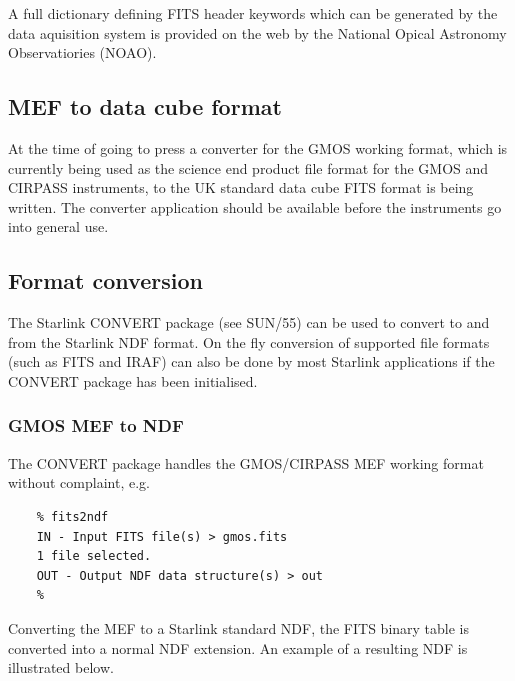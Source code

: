 \documentclass[twoside,11pt]{article}
\newcommand{\htmladdnormallink}[2]{#1}
\newcommand{\xref}[3]{#1}
\newcommand{\xlabel}[1]{}
\begin{document}
A full \htmladdnormallink{dictionary}{http://iraf.noao.edu/projects/ccdmosaic/imagedef/fitsdic.html} defining FITS header keywords which can be generated by the data aquisition system is provided on the web by the National Opical Astronomy Observatiories (NOAO).
 
\subsection{\xlabel{sc16_mef2cub}MEF to data cube format\label{sc16_mef2cub}}

At the time of going to press a converter for the GMOS working format, which is currently being used as the science end product file format for the GMOS and CIRPASS instruments, to the UK standard data cube FITS format is being written. The converter application should be available before the instruments go into general use. 

\subsection{\xlabel{sc16_converting}Format conversion\label{sc16_converting}}

The Starlink CONVERT package (see \xref{SUN/55}{sun55}{}) can be used to convert to and from the Starlink NDF format. On the fly conversion of supported file formats (such as FITS and IRAF) can also be done by most Starlink applications if the CONVERT package has been initialised.

\subsubsection{GMOS MEF to NDF}

The \xref{CONVERT}{sun55}{} package handles the GMOS/CIRPASS MEF working format without complaint, e.g.\

\begin{verbatim}
    % fits2ndf
    IN - Input FITS file(s) > gmos.fits
    1 file selected.
    OUT - Output NDF data structure(s) > out
    %
\end{verbatim}

Converting the MEF to a Starlink standard NDF, the FITS binary table is converted into a normal NDF extension. An example of a resulting NDF is illustrated below.
\end{document}

